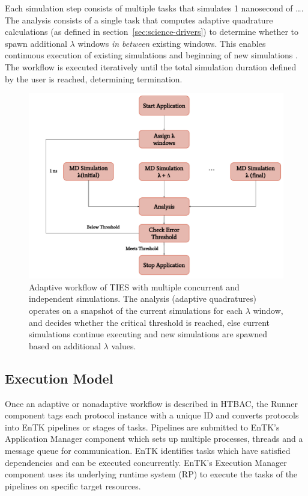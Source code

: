 Each simulation step consists of multiple tasks that simulates 1 nanosecond
of \ldots {}. The analysis
consists of a single task that computes adaptive quadrature calculations (as
defined in section~\ref{sec:science-drivers}) to determine whether to spawn
additional $\lambda$ windows \textit{in between} existing windows. This
enables continuous execution of existing simulations and beginning of new
simulations .
The workflow is executed iteratively until the total simulation duration
defined by the user is reached, determining termination.

\begin{figure}
  \centering
  \includegraphics[width=\columnwidth]{figures/adaptive_TIES_workflow_diagram.pdf}
  \caption{Adaptive workflow of TIES with multiple concurrent and independent
  simulations. The analysis (adaptive quadratures) operates on a snapshot of
  the current simulations for each $\lambda$ window, and decides whether the
  critical threshold is reached, else current simulations continue executing
  and new simulations are spawned based on additional $\lambda$ values.}
\label{fig:adaptive_ties}
\end{figure}

\subsection{Execution Model}

Once an adaptive or nonadaptive workflow is described in HTBAC, the Runner
component tags each protocol instance with a unique ID and converts protocols
into EnTK pipelines or stages of tasks. Pipelines are submitted to EnTK's
Application Manager component which sets up multiple processes, threads and a
message queue for communication. EnTK identifies tasks which have satisfied
dependencies and can be executed concurrently. EnTK's Execution Manager
component uses its underlying runtime system (RP) to execute the tasks of the
pipelines on specific target resources.

